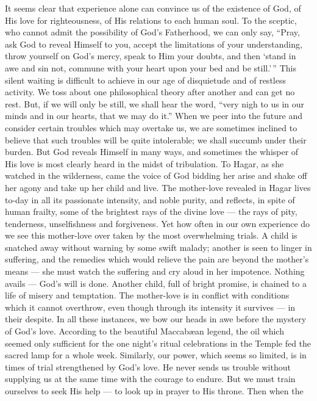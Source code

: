 It seems clear that experience alone can
convince us of the existence of God, of His
love for righteousness, of His relations to
each human soul. To the sceptic, who
cannot admit the possibility of God’s Fatherhood,
we can only say, “Pray, ask God
to reveal Himself to you, accept the
limitations of your understanding, throw
yourself on God’s mercy, speak to Him
your doubts, and then ‘stand in awe and
sin not, commune with your heart upon
your bed and be still.’\,” This silent waiting
is difficult to achieve in our age of disquietude
and of restless activity. We toss
about one philosophical theory after another
and can get no rest. But, if we will only
be still, we shall hear the word, “very nigh
to us in our minds and in our hearts, that
we may do it.” When we peer into the
future and consider certain troubles which
may overtake us, we are sometimes inclined
to believe that such troubles will be quite
intolerable; we shall succumb under their
burden. But God reveals Himself in many
ways, and sometimes the whisper of His love
is most clearly heard in the midst of tribulation.
To Hagar, as she watched in the
wilderness, came the voice of God bidding
her arise and shake off her agony and take
up her child and live. The mother-love
revealed in Hagar lives to-day in all its
passionate intensity, and noble purity, and
reflects, in spite of human frailty, some of
the brightest rays of the divine love — the
rays of pity, tenderness, unselfishness and
forgiveness. Yet how often in our own
experience do we see this mother-love over
taken by the most overwhelming trials. A
child is snatched away without warning by
some swift malady; another is seen to linger
in suffering, and the remedies which would
relieve the pain are beyond the mother’s
means — she must watch the suffering and
cry aloud in her impotence. Nothing avails
 — God’s will is done. Another child, full
of bright promise, is chained to a life of
misery and temptation. The mother-love
is in conflict with conditions which it cannot
overthrow, even though through its intensity
it survives — in their despite. In all these
instances, we bow our heads in awe before
the mystery of God’s love. According to
the beautiful Maccabæan legend, the oil
which seemed only sufficient for the one
night’s ritual celebrations in the Temple
fed the sacred lamp for a whole week.
Similarly, our power, which seems so limited,
is in times of trial strengthened by God's
love. He never sends us trouble without
supplying us at the same time with the
courage to endure. But we must train
ourselves to seek His help — to look up in
prayer to His throne. Then when the
